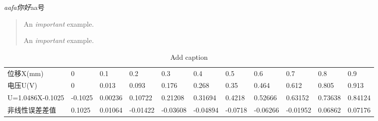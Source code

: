 \documentclass{myarticle}
\begin{document}
%	
	\emph{aafa你好}aa号
	
	\begin{quotation}
		An \emph{important} example.
		
		An \emph{important} example.
				
	\end{quotation}
\begin{table}[!htbp]
	\flushleft
	\caption{Add caption}
	\begin{tabular}[scale=0.7]{|l|llllllllll|}
		\hline
		\rowcolor[rgb]{ .749,  .749,  .749} \multicolumn{11}{|c|}{\textcolor[rgb]{ 0,  .439,  .753}{光纤位移传感器输出电压与位移数据}} \bigstrut\\
		\hline
		\rowcolor[rgb]{ .749,  .749,  .749} \textcolor[rgb]{ 0,  .439,  .753}{位移X(mm)} & \cellcolor[rgb]{ 1,  1,  1}0 & \cellcolor[rgb]{ 1,  1,  1}0.1 & \cellcolor[rgb]{ 1,  1,  1}0.2 & \cellcolor[rgb]{ 1,  1,  1}0.3 & \cellcolor[rgb]{ 1,  1,  1}0.4 & \cellcolor[rgb]{ 1,  1,  1}0.5 & \cellcolor[rgb]{ 1,  1,  1}0.6 & \cellcolor[rgb]{ 1,  1,  1}0.7 & \cellcolor[rgb]{ 1,  1,  1}0.8 & \cellcolor[rgb]{ 1,  1,  1}0.9 \bigstrut[t]\\
		\rowcolor[rgb]{ .749,  .749,  .749} \textcolor[rgb]{ 0,  .439,  .753}{电压U(V)} & \cellcolor[rgb]{ 1,  1,  1}0 & \cellcolor[rgb]{ 1,  1,  1}0.013 & \cellcolor[rgb]{ 1,  1,  1}0.093 & \cellcolor[rgb]{ 1,  1,  1}0.176 & \cellcolor[rgb]{ 1,  1,  1}0.268 & \cellcolor[rgb]{ 1,  1,  1}0.35 & \cellcolor[rgb]{ 1,  1,  1}0.464 & \cellcolor[rgb]{ 1,  1,  1}0.612 & \cellcolor[rgb]{ 1,  1,  1}0.805 & \cellcolor[rgb]{ 1,  1,  1}0.913 \\
		\rowcolor[rgb]{ .749,  .749,  .749} \textcolor[rgb]{ 0,  .439,  .753}{U=1.0486X-0.1025} & \cellcolor[rgb]{ 1,  1,  1}-0.1025 & \cellcolor[rgb]{ 1,  1,  1}0.00236 & \cellcolor[rgb]{ 1,  1,  1}0.10722 & \cellcolor[rgb]{ 1,  1,  1}0.21208 & \cellcolor[rgb]{ 1,  1,  1}0.31694 & \cellcolor[rgb]{ 1,  1,  1}0.4218 & \cellcolor[rgb]{ 1,  1,  1}0.52666 & \cellcolor[rgb]{ 1,  1,  1}0.63152 & \cellcolor[rgb]{ 1,  1,  1}0.73638 & \cellcolor[rgb]{ 1,  1,  1}0.84124 \\
		\rowcolor[rgb]{ .749,  .749,  .749} \textcolor[rgb]{ 0,  .439,  .753}{非线性误差差值} & \cellcolor[rgb]{ 1,  1,  1}0.1025 & \cellcolor[rgb]{ 1,  1,  1}0.01064 & \cellcolor[rgb]{ 1,  1,  1}-0.01422 & \cellcolor[rgb]{ 1,  1,  1}-0.03608 & \cellcolor[rgb]{ 1,  1,  1}-0.04894 & \cellcolor[rgb]{ 1,  1,  1}-0.0718 & \cellcolor[rgb]{ 1,  1,  1}-0.06266 & \cellcolor[rgb]{ 1,  1,  1}-0.01952 & \cellcolor[rgb]{ 1,  1,  1}0.06862 & \cellcolor[rgb]{ 1,  1,  1}0.07176 \\

\end{tabular}
\end{table}
\end{document}
